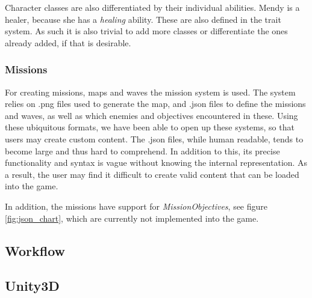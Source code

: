 Character classes are also differentiated by their individual abilities.
Mendy is a healer, because she has a \emph{healing} ability.
These are also defined in the trait system.
As such it is also trivial to add more classes or differentiate the ones already added, if that is desirable.

\subsubsection{Missions}\label{dicsussion:missions}
For creating missions, maps and waves the mission system is used.
The system relies on .png files used to generate the map, and .json files to define the missions and waves, as well as which enemies and objectives encountered in these.
Using these ubiquitous formats, we have been able to open up these systems, so that users may create custom content.
The .json files, while human readable, tends to become large and thus hard to comprehend.
In addition to this, its precise functionality and syntax is vague without knowing the internal representation.
As a result, the user may find it difficult to create valid content that can be loaded into the game.

In addition, the missions have support for \textit{MissionObjectives}, see figure \ref{fig:json_chart}, which are currently not implemented into the game.

\subsection{Workflow}

\subsection{Unity3D}




%


